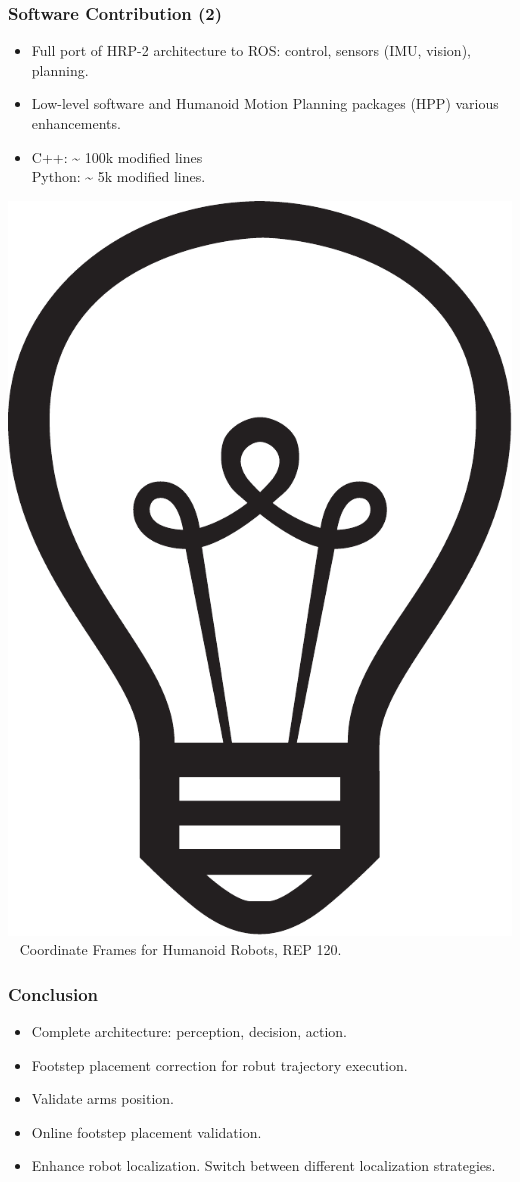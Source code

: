 \documentclass[14pt,utf8,hyperref={pdfpagelabels=false}]{beamer}
\begin{document}
\begin{slidePerception}
  \frametitle{Software Contribution (2)}

  \begin{changeleftmargin}{1.1cm}
    \begin{itemize}
      \item Full port of HRP-2 architecture to
        ROS: control, sensors (IMU, vision), planning.
      \item Low-level software and Humanoid Motion Planning
        packages (HPP) various enhancements.
      \item C++: \textasciitilde{} 100k modified lines\\
        Python: \textasciitilde{} 5k modified lines.
    \end{itemize}

    \bigskip

    \includegraphics[height=.5cm]{src/slides/idea.pdf}~%
    Coordinate Frames for Humanoid Robots, REP 120.

  \end{changeleftmargin}
\end{slidePerception}



\begin{frame}
  \frametitle{Conclusion}


  \begin{itemize}
  \item Complete architecture: perception, decision, action.
  \item Footstep placement correction for robut trajectory execution.
  \end{itemize}

  \bigskip

  \begin{itemize}
  \item Validate arms position.
  \item Online footstep placement validation.
  \item Enhance robot localization. Switch between different
    localization strategies.
  \end{itemize}
\end{frame}
\end{document}
